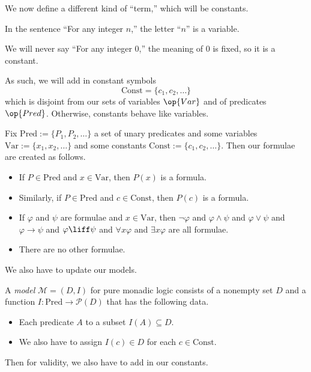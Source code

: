 \documentclass[../notes.tex]{subfiles}
\begin{document}
We now define a different kind of ``term,'' which will be constants.
\begin{example}
	In the sentence ``For any integer $n$,'' the letter ``$n$'' is a variable.
\end{example}
\begin{example}
	We will never say ``For any integer $0$,'' the meaning of $0$ is fixed, so it is a constant.
\end{example}
As such, we will add in constant symbols
\[\mathrm{Const}=\{c_1,c_2,\ldots\}\]
which is disjoint from our sets of variables $\op{Var}$ and of predicates $\op{Pred}$. Otherwise, constants behave like variables.
\begin{defihelper} \label{def:formulawithconsts}
	Fix $\mathrm{Pred}:=\{P_1,P_2,\ldots\}$ a set of unary predicates and some variables $\mathrm{Var}:=\{x_1,x_2,\ldots\}$ and some constants $\mathrm{Const}:=\{c_1,c_2,\ldots\}$. Then our formulae are created as follows.
	\begin{itemize}
		\item If $P\in\mathrm{Pred}$ and $x\in\mathrm{Var}$, then $P(x)$ is a formula.
		\item Similarly, if $P\in\mathrm{Pred}$ and $c\in\mathrm{Const}$, then $P(c)$ is a formula.
		\item If $\varphi$ and $\psi$ are formulae and $x\in\mathrm{Var}$, then $\lnot\varphi$ and $\varphi\land\psi$ and $\varphi\lor\psi$ and $\varphi\to\psi$ and $\varphi\liff\psi$ and $\forall x\varphi$ and $\exists x\varphi$ are all formulae.
		\item There are no other formulae.
	\end{itemize}
\end{defihelper}
We also have to update our models.
\begin{defihelper}[Model]
	A \textit{model} $\mathcal M=(D,I)$ for pure monadic logic consists of a nonempty set $D$ and a function $I:\mathrm{Pred}\to\mathcal P(D)$ that has the following data.
	\begin{itemize}
		\item Each predicate $A$ to a subset $I(A)\subseteq D$.
		\item We also have to assign $I(c)\in D$ for each $c\in\mathrm{Const}$.
	\end{itemize}
\end{defihelper}
Then for validity, we also have to add in our constants.
\end{document}
